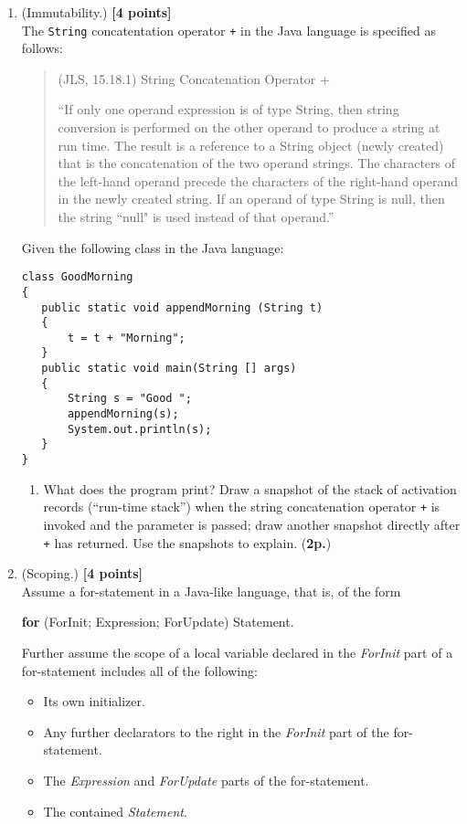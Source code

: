 \documentclass{article}
\begin{document}
\begin{enumerate}
\item (Immutability.) \hfill{\textbf{[4 points]}}
\\
The \texttt{String} concatentation operator \texttt{+} in the Java
language is specified as follows:


\begin{quote}
(JLS, 15.18.1) String Concatenation Operator +

``If only one operand expression is of type String, then string conversion is performed on the other operand to produce a string at run time. The result is a reference to a String object (newly created) that is the concatenation of the two operand strings. The characters of the left-hand operand precede the characters of the right-hand operand in the newly created string. If an operand of type String is null, then the string ``null" is used instead of that operand.''
\end{quote}

 Given the following class 
in the Java language: 
{\small 
\begin{verbatim}
class GoodMorning 
{
   public static void appendMorning (String t)
   {
       t = t + "Morning";
   }
   public static void main(String [] args)
   {
       String s = "Good ";
       appendMorning(s);
       System.out.println(s);
   }
}
\end{verbatim}
}
\begin{enumerate}
The specification of the string concatentation operator allows 
the Java String class to be \textit{immutable}. Read the
specification above carefully and determine \textit{where} in the specification
immutability comes into play. Give the  phrase(s) literally, as used in 
the wording of the specification. (\textbf{2p.})
\item What does the program print? 
Draw a snapshot of the stack of activation records (``run-time stack'')
when the string concatenation operator \texttt{+} is invoked and the parameter is passed;
draw another snapshot directly after \texttt{+} has returned. 
Use the snapshots to explain. (\textbf{2p.})
\end{enumerate}


\item (Scoping.)
\hfill{\textbf{[4 points]}}
\\
Assume a for-statement in a Java-like language, that is, of the form
 
\begin{center}
  \textbf{for} (ForInit; Expression; ForUpdate) Statement.
\end{center}
Further assume the scope of a local variable declared in the 
\textit{ForInit} part of a 
for-statement includes all of the following:
\begin{itemize}
    \item Its own initializer.
    \item Any further declarators to the right in the \textit{ForInit} 
          part of the for-statement.
    \item The \textit{Expression} and \textit{ForUpdate} parts of the 
          for-statement.
    \item The contained \textit{Statement}. 
\end{itemize}


\end{enumerate}
\end{document}
